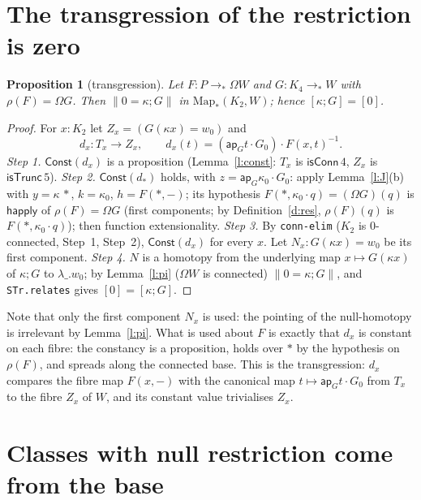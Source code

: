 \documentclass[11pt]{amsart}
\newtheorem{proposition}[theorem]{Proposition}
\theoremstyle{definition}
\theoremstyle{remark}
\newcommand{\Om}{\Omega}
\newcommand{\Map}{\mathrm{Map}_*}
\newcommand{\code}[1]{\texttt{#1}}
\newcommand{\cT}{\mathsf{isTrunc}}
\newcommand{\cC}{\mathsf{isConn}}
\newcommand{\ap}{\mathsf{ap}}
\newcommand{\Const}{\mathsf{Const}}
\newcommand{\tr}[1]{\|#1\|}
\begin{document}
\section{The transgression of the restriction is zero}

\begin{proposition}[transgression]\label{p:trans}
Let $F:P\to_*\Om W$ and $G:K_4\to_*W$ with $\rho(F)=\Om G$. Then
$\tr{0=\kappa;G}$ in $\Map(K_2,W)$; hence $[\kappa;G]=[0]$.
\end{proposition}
\begin{proof}
For $x:K_2$ let $Z_x=(G(\kappa x)=w_0)$ and
\[d_x:T_x\to Z_x,\qquad d_x(t)=(\ap_Gt\cdot G_0)\cdot F(x,t)^{-1}.\]
\emph{Step 1.} $\Const(d_x)$ is a proposition (Lemma~\ref{l:const}: $T_x$
is $\cC\,4$, $Z_x$ is $\cT\,5$).
\emph{Step 2.} $\Const(d_*)$ holds, with $z=\ap_G\kappa_0\cdot G_0$:
apply Lemma~\ref{l:J}(b) with $y=\kappa\,*$, $k=\kappa_0$,
$h=F(*,-)$; its hypothesis $F(*,\kappa_0\cdot q)=(\Om G)(q)$ is
$\mathsf{happly}$ of $\rho(F)=\Om G$ (first components; by
Definition~\ref{d:res}, $\rho(F)(q)$ is $F(*,\kappa_0\cdot q)$); then
function extensionality.
\emph{Step 3.} By \code{conn-elim} ($K_2$ is 0-connected, Step~1, Step~2),
$\Const(d_x)$ for every $x$. Let $N_x:G(\kappa x)=w_0$ be its first
component.
\emph{Step 4.} $N$ is a homotopy from the underlying map $x\mapsto
G(\kappa x)$ of $\kappa;G$ to $\lambda\_.w_0$; by Lemma~\ref{l:pi}
($\Om W$ is connected) $\tr{0=\kappa;G}$, and
\code{STr.relates} gives $[0]=[\kappa;G]$.
\end{proof}

Note that only the first component $N_x$ is used: the pointing of the
null-homotopy is irrelevant by Lemma~\ref{l:pi}. What is used about $F$
is exactly that $d_x$ is constant on each fibre: the constancy is a
proposition, holds over $*$ by the hypothesis on $\rho(F)$, and spreads
along the connected base. This is the transgression: $d_x$ compares the
fibre map $F(x,-)$ with the canonical map $t\mapsto\ap_Gt\cdot G_0$ from
$T_x$ to the fibre $Z_x$ of $W$, and its constant value trivialises
$Z_x$.

\section{Classes with null restriction come from the base}
\end{document}
